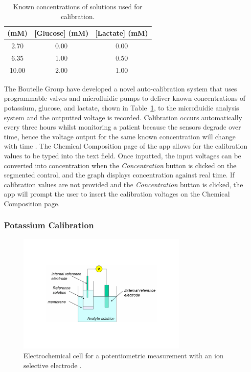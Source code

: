 \begin{table}[h!]
\centering
\begin{tabular}{||c c c||} 
 \hline
 [K$^{+}$] (mM) & [Glucose] (mM) & [Lactate] (mM) \\ [0.5ex] 
 \hline\hline
 2.70 & 0.00 & 0.00 \\
 6.35 & 1.00 & 0.50 \\
 10.00 & 2.00 & 1.00 \\
 \hline
\end{tabular}
\caption{Known concentrations of solutions used for calibration.}
\label{table: calibration conc}
\end{table}

The Boutelle Group have developed a novel auto-calibration system that uses programmable valves and microfluidic pumps to deliver known concentrations of potassium, glucose, and lactate, shown in Table~\ref{table: calibration conc}, to the microfluidic analysis system and the outputted voltage is recorded. Calibration occurs automatically every three hours whilst monitoring a patient because the sensors degrade over time, hence the voltage output for the same known concentration will change with time \cite{Rogers2017}. The Chemical Composition page of the app allows for the calibration values to be typed into the text field. Once inputted, the input voltages can be converted into concentration when the \textit{Concentration} button is clicked on the segmented control, and the graph displays concentration against real time. If calibration values are not provided and the \textit{Concentration} button is clicked, the app will prompt the user to insert the calibration voltages on the Chemical Composition page. 

\subsubsection{Potassium Calibration}

\begin{figure}[h!]
\centering
\includegraphics[trim={0cm 5cm 0cm  5cm}, clip, width=0.75\textwidth]{./figures/ISE.pdf}
\captionsetup{justification=centering}
\caption{Electrochemical cell for a potentiometric measurement with an ion selective electrode \cite{LibreTexts2019}.}
\label{fig: ISE}
\end{figure}

